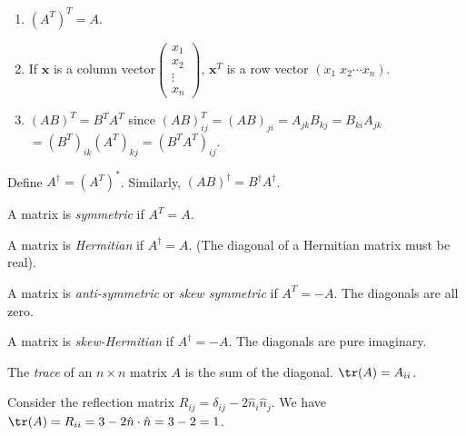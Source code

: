 \documentclass[a4paper]{article}
\begin{document}
\begin{prop}\leavevmode
  \begin{enumerate}
    \item $(A^T)^T = A$.
    \item If $\mathbf{x}$ is a column vector$\begin{pmatrix}x_1\\x_2\\\vdots\\x_n\end{pmatrix}$, $\mathbf{x}^T$ is a row vector $(x_1\; x_2\cdots x_n)$.
    \item $(AB)^T = B^TA^T$ since $(AB)^T_{ij} = (AB)_{ji} = A_{jk}B_{kj} = B_{ki}A_{jk} $\\$= (B^T)_{ik}(A^T)_{kj} = (B^TA^T)_{ij}$.
  \end{enumerate}
\end{prop}

\begin{defi}
  Define $A^{\dagger} = (A^T)^*$. Similarly, $(AB)^\dagger = B^\dagger A^\dagger$.
\end{defi}

\begin{defi}
  A matrix is \emph{symmetric} if $A^T = A$.
\end{defi}

\begin{defi}
  A matrix is \emph{Hermitian} if $A^\dagger = A$. (The diagonal of a Hermitian matrix must be real).
\end{defi}

\begin{defi}
  A matrix is \emph{anti-symmetric} or \emph{skew symmetric} if $A^T = -A$. The diagonals are all zero.
\end{defi}

\begin{defi}
  A matrix is \emph{skew-Hermitian} if $A^\dagger = -A$. The diagonals are pure imaginary.
\end{defi}

\begin{defi}
  The \emph{trace} of an $n\times n$ matrix $A$ is the sum of the diagonal. $\tr(A) = A_{ii}$.
\end{defi}

\begin{eg}
  Consider the reflection matrix $R_{ij} = \delta_{ij} - 2\hat n_i \hat n_j$. We have $\tr(A) = R_{ii} = 3 - 2\hat{n}\cdot \hat{n} = 3 - 2 = 1$.
\end{eg}
\end{document}
